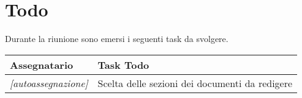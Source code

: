 \section{Todo}
Durante la riunione sono emersi i seguenti task da svolgere.

\begin{center}
  \begin{tabular}{|p{5cm}|p{8cm}|}
    \hline
    \textbf{Assegnatario}       & \textbf{Task Todo}                             \\ \hline
    \textit{[autoassegnazione]} & Scelta delle sezioni dei documenti da redigere       \\ \hline
  \end{tabular}
\end{center}
